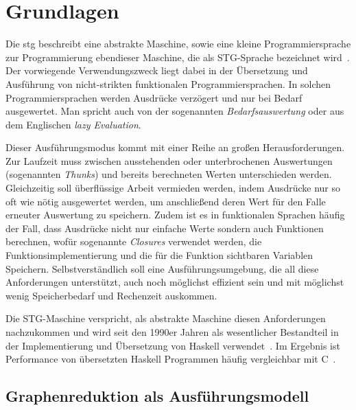 
\chapter{Grundlagen}\label{chap:grundlagen}

Die \gls{stg} beschreibt eine abstrakte Maschine, sowie eine kleine Programmiersprache zur Programmierung ebendieser Maschine, die als STG-Sprache bezeichnet wird~\cite{Jones_StockHardwareSTG}.
Der vorwiegende Verwendungszweck liegt dabei in der Übersetzung und Ausführung von nicht-strikten funktionalen Programmiersprachen.
In solchen Programmiersprachen werden Ausdrücke verzögert und nur bei Bedarf ausgewertet.
Man spricht auch von der sogenannten \textit{Bedarfsauswertung} oder aus dem Englischen \textit{lazy Evaluation}.


Dieser Ausführungsmodus kommt mit einer Reihe an großen Herausforderungen.
Zur Laufzeit muss zwischen ausstehenden oder unterbrochenen Auswertungen (sogenannten \textit{Thunks}) und bereits berechneten Werten unterschieden werden.
Gleichzeitig soll überflüssige Arbeit vermieden werden, indem Ausdrücke nur so oft wie nötig ausgewertet werden, um anschließend deren Wert für den Falle erneuter Auswertung zu speichern.
Zudem ist es in funktionalen Sprachen häufig der Fall, dass Ausdrücke nicht nur einfache Werte sondern auch Funktionen berechnen, wofür sogenannte \textit{Closures} verwendet werden, die Funktionsimplementierung und die für die Funktion sichtbaren Variablen Speichern.
Selbstverständlich soll eine Ausführungsumgebung, die all diese Anforderungen unterstützt, auch noch möglichst effizient sein und mit möglichst wenig Speicherbedarf und Rechenzeit auskommen.

Die STG-Maschine verspricht, als abstrakte Maschine diesen Anforderungen nachzukommen und wird seit den 1990er Jahren als wesentlicher Bestandteil in der Implementierung und Übersetzung von Haskell verwendet~\cite{Bolingbroke_WhatIsSTG}.
Im Ergebnis ist Performance von übersetzten Haskell Programmen häufig vergleichbar mit C~\cite{PeytonJones_FastCurry}.


\section{Graphenreduktion als Ausführungsmodell}

